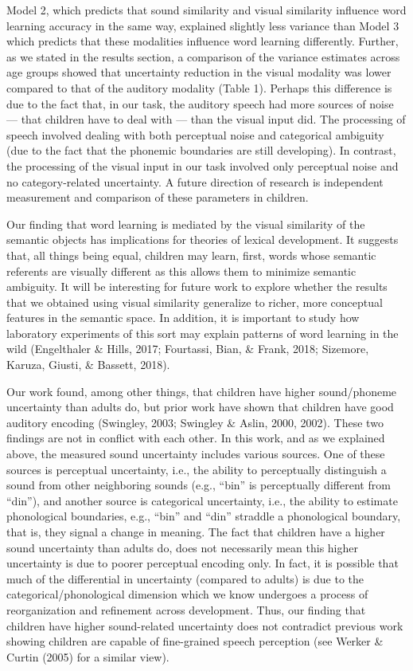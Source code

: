 \documentclass[english,,man]{apa6}
\begin{document}
Model 2, which predicts that sound similarity and visual similarity influence word learning accuracy in the same way, explained slightly less variance than Model 3 which predicts that these modalities influence word learning differently. Further, as we stated in the results section, a comparison of the variance estimates across age groups showed that uncertainty reduction in the visual modality was lower compared to that of the auditory modality (Table 1). Perhaps this difference is due to the fact that, in our task, the auditory speech had more sources of noise --- that children have to deal with --- than the visual input did. The processing of speech involved dealing with both perceptual noise and categorical ambiguity (due to the fact that the phonemic boundaries are still developing). In contrast, the processing of the visual input in our task involved only perceptual noise and no category-related uncertainty. A future direction of research is independent measurement and comparison of these parameters in children.

Our finding that word learning is mediated by the visual similarity of the semantic objects has implications for theories of lexical development. It suggests that, all things being equal, children may learn, first, words whose semantic referents are visually different as this allows them to minimize semantic ambiguity. It will be interesting for future work to explore whether the results that we obtained using visual similarity generalize to richer, more conceptual features in the semantic space. In addition, it is important to study how laboratory experiments of this sort may explain patterns of word learning in the wild (Engelthaler \& Hills, 2017; Fourtassi, Bian, \& Frank, 2018; Sizemore, Karuza, Giusti, \& Bassett, 2018).

Our work found, among other things, that children have higher sound/phoneme uncertainty than adults do, but prior work have shown that children have good auditory encoding (Swingley, 2003; Swingley \& Aslin, 2000, 2002). These two findings are not in conflict with each other. In this work, and as we explained above, the measured sound uncertainty includes various sources. One of these sources is perceptual uncertainty, i.e., the ability to perceptually distinguish a sound from other neighboring sounds (e.g., \enquote{bin} is perceptually different from \enquote{din}), and another source is categorical uncertainty, i.e., the ability to estimate phonological boundaries, e.g., \enquote{bin} and \enquote{din} straddle a phonological boundary, that is, they signal a change in meaning. The fact that children have a higher sound uncertainty than adults do, does not necessarily mean this higher uncertainty is due to poorer perceptual encoding only. In fact, it is possible that much of the differential in uncertainty (compared to adults) is due to the categorical/phonological dimension which we know undergoes a process of reorganization and refinement across development. Thus, our finding that children have higher sound-related uncertainty does not contradict previous work showing children are capable of fine-grained speech perception (see Werker \& Curtin (2005) for a similar view).
\end{document}
